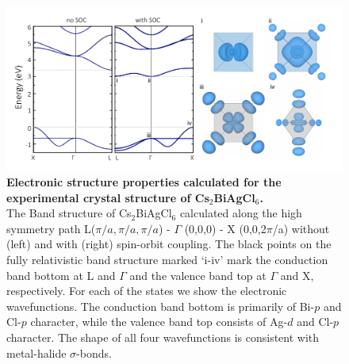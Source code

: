 \documentclass[journal=jpcl,manuscript=letter,layout=traditional]{achemso}
\begin{document}
\begin{figure}[t!]
\begin{center}
\includegraphics[width=1.0\textwidth]{fig3.png}
\end{center}
\caption{\label{fig:3}
  \textbf{Electronic structure properties calculated for the experimental crystal structure of Cs$_2$BiAgCl$_6$.}\\
  The Band structure of Cs$_2$BiAgCl$_6$ calculated along the high symmetry path L($\pi/a, \pi/a, \pi/a$) - $\Gamma$ (0,0,0)
  - X (0,0,2$\pi$/a) without (left) and with (right) spin-orbit coupling.
  The black points on the fully relativistic band structure marked `i-iv' mark the conduction band bottom at L
  and $\Gamma$ and the valence band top at $\Gamma$ and X, respectively. For each of the states we show the electronic wavefunctions. The   conduction band bottom is primarily of
  Bi-$p$ and Cl-$p$ character, while the valence band top consists of Ag-$d$ and Cl-$p$ character. The shape of all
  four wavefunctions is consistent with metal-halide $\sigma$-bonds.
}
\end{figure}
\end{document}
